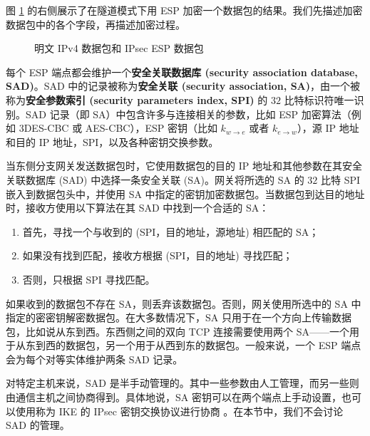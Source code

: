 \begin{snote}
图 \ref{fig:9-6} 的右侧展示了在隧道模式下用 ESP 加密一个数据包的结果。我们先描述加密数据包中的各个字段，再描述加密过程。
\end{snote}

\begin{figure}
  \centering
  
  \caption{明文 IPv4 数据包和 IPsec ESP 数据包}
  \label{fig:9-6}
\end{figure}

\begin{snote}
每个 ESP 端点都会维护一个\textbf{安全关联数据库 (security association database, SAD)}。SAD 中的记录被称为\textbf{安全关联 (security association, SA)}，由一个被称为\textbf{安全参数索引 (security parameters index, SPI)} 的 $32$ 比特标识符唯一识别。SAD 记录（即 SA）中包含许多与连接相关的参数，比如 ESP 加密算法（例如 3DES-CBC 或 AES-CBC），ESP 密钥（比如 $k_{w\to e}$ 或者 $k_{e\to w}$），源 IP 地址和目的 IP 地址，SPI，以及各种密钥交换参数。

当东侧分支网关发送数据包时，它使用数据包的目的 IP 地址和其他参数在其安全关联数据库 (SAD) 中选择一条安全关联 (SA)。网关将所选的 SA 的 $32$ 比特 SPI 嵌入到数据包头中，并使用 SA 中指定的密钥加密数据包。当数据包到达目的地址时，接收方使用以下算法在其 SAD 中找到一个合适的 SA：
\begin{enumerate}
	\item 首先，寻找一个与收到的 (SPI，目的地址，源地址) 相匹配的 SA；
	\item 如果没有找到匹配，接收方根据 (SPI，目的地址) 寻找匹配；
	\item 否则，只根据 SPI 寻找匹配。
\end{enumerate}
如果收到的数据包不存在 SA，则丢弃该数据包。否则，网关使用所选中的 SA 中指定的密密钥解密数据包。在大多数情况下，SA 只用于在一个方向上传输数据包，比如说从东到西。东西侧之间的双向 TCP 连接需要使用两个 SA——一个用于从东到西的数据包，另一个用于从西到东的数据包。一般来说，一个 ESP 端点会为每个对等实体维护两条 SAD 记录。

对特定主机来说，SAD 是半手动管理的。其中一些参数由人工管理，而另一些则由通信主机之间协商得到。具体地说，SA 密钥可以在两个端点上手动设置，也可以使用称为 IKE 的 IPsec 密钥交换协议进行协商 \cite{kaufman2014internet}。在本节中，我们不会讨论 SAD 的管理。
\end{snote}

